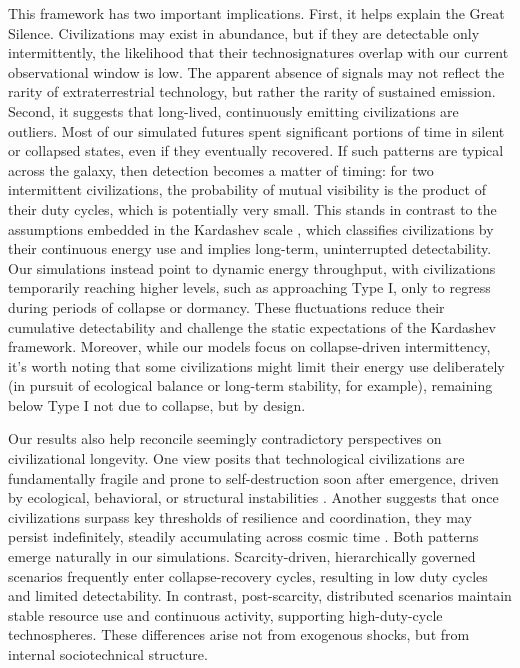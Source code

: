 This framework has two important implications. First, it helps explain the Great Silence. Civilizations may exist in abundance, but if they are detectable only intermittently, the likelihood that their technosignatures overlap with our current observational window is low. The apparent absence of signals may not reflect the rarity of extraterrestrial technology, but rather the rarity of sustained emission. Second, it suggests that long-lived, continuously emitting civilizations are outliers. Most of our simulated futures spent significant portions of time in silent or collapsed states, even if they eventually recovered. If such patterns are typical across the galaxy, then detection becomes a matter of timing: for two intermittent civilizations, the probability of mutual visibility is the product of their duty cycles, which is potentially very small. This stands in contrast to the assumptions embedded in the Kardashev scale \citep{Kardashev1964-gv}, which classifies civilizations by their continuous energy use and implies long-term, uninterrupted detectability. Our simulations instead point to dynamic energy throughput, with civilizations temporarily reaching higher levels, such as approaching Type I, only to regress during periods of collapse or dormancy. These fluctuations reduce their cumulative detectability and challenge the static expectations of the Kardashev framework. Moreover, while our models focus on collapse-driven intermittency, it's worth noting that some civilizations might limit their energy use deliberately (in pursuit of ecological balance or long-term stability, for example), remaining below Type I not due to collapse, but by design.

Our results also help reconcile seemingly contradictory perspectives on civilizational longevity. One view posits that technological civilizations are fundamentally fragile and prone to self-destruction soon after emergence, driven by ecological, behavioral, or structural instabilities \citep{Vinn2024-pi}. Another suggests that once civilizations surpass key thresholds of resilience and coordination, they may persist indefinitely, steadily accumulating across cosmic time \citep{Grinspoon2009-cg}. Both patterns emerge naturally in our simulations. Scarcity-driven, hierarchically governed scenarios frequently enter collapse-recovery cycles, resulting in low duty cycles and limited detectability. In contrast, post-scarcity, distributed scenarios maintain stable resource use and continuous activity, supporting high-duty-cycle technospheres. These differences arise not from exogenous shocks, but from internal sociotechnical structure.

